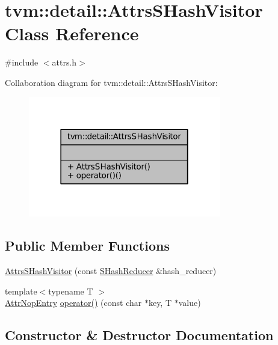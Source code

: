 \hypertarget{classtvm_1_1detail_1_1AttrsSHashVisitor}{}\section{tvm\+:\+:detail\+:\+:Attrs\+S\+Hash\+Visitor Class Reference}
\label{classtvm_1_1detail_1_1AttrsSHashVisitor}


{\ttfamily \#include $<$attrs.\+h$>$}



Collaboration diagram for tvm\+:\+:detail\+:\+:Attrs\+S\+Hash\+Visitor\+:
\nopagebreak
\begin{figure}[H]
\begin{center}
\leavevmode
\includegraphics[width=238pt]{classtvm_1_1detail_1_1AttrsSHashVisitor__coll__graph}
\end{center}
\end{figure}
\subsection*{Public Member Functions}
\begin{DoxyCompactItemize}
\item 
\hyperlink{classtvm_1_1detail_1_1AttrsSHashVisitor_af5b71e60c1383705d275a5087f3073bb}{Attrs\+S\+Hash\+Visitor} (const \hyperlink{classtvm_1_1SHashReducer}{S\+Hash\+Reducer} \&hash\+\_\+reducer)
\item 
{\footnotesize template$<$typename T $>$ }\\\hyperlink{structtvm_1_1detail_1_1AttrNopEntry}{Attr\+Nop\+Entry} \hyperlink{classtvm_1_1detail_1_1AttrsSHashVisitor_a0b9995a8e489eefd6f8ef44eaf7840ca}{operator()} (const char $\ast$key, T $\ast$value)
\end{DoxyCompactItemize}


\subsection{Constructor \& Destructor Documentation}
